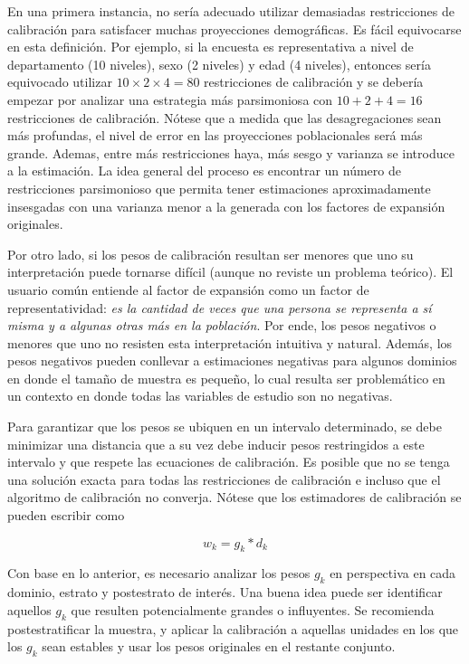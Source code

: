 \documentclass[
  10pt,
  spanish,
]{book}
\begin{document}
En una primera instancia, no sería adecuado utilizar demasiadas restricciones de calibración para satisfacer muchas proyecciones demográficas. Es fácil equivocarse en esta definición. Por ejemplo, si la encuesta es representativa a nivel de departamento (10 niveles), sexo (2 niveles) y edad (4 niveles), entonces sería equivocado utilizar \(10 \times 2 \times 4 = 80\) restricciones de calibración y se debería empezar por analizar una estrategia más parsimoniosa con \(10 + 2 + 4 = 16\) restricciones de calibración. Nótese que a medida que las desagregaciones sean más profundas, el nivel de error en las proyecciones poblacionales será más grande. Ademas, entre más restricciones haya, más sesgo y varianza se introduce a la estimación. La idea general del proceso es encontrar un número de restricciones parsimonioso que permita tener estimaciones aproximadamente insesgadas con una varianza menor a la generada con los factores de expansión originales.

Por otro lado, si los pesos de calibración resultan ser menores que uno su interpretación puede tornarse difícil (aunque no reviste un problema teórico). El usuario común entiende al factor de expansión como un factor de representatividad: \emph{es la cantidad de veces que una persona se representa a sí misma y a algunas otras más en la población}. Por ende, los pesos negativos o menores que uno no resisten esta interpretación intuitiva y natural. Además, los pesos negativos pueden conllevar a estimaciones negativas para algunos dominios en donde el tamaño de muestra es pequeño, lo cual resulta ser problemático en un contexto en donde todas las variables de estudio son no negativas.

Para garantizar que los pesos se ubiquen en un intervalo determinado, se debe minimizar una distancia que a su vez debe inducir pesos restringidos a este intervalo y que respete las ecuaciones de calibración. Es posible que no se tenga una solución exacta para todas las restricciones de calibración e incluso que el algoritmo de calibración no converja. Nótese que los estimadores de calibración se pueden escribir como

\[
w_k = g_k * d_k
\]

Con base en lo anterior, es necesario analizar los pesos \(g_k\) en perspectiva en cada dominio, estrato y postestrato de interés. Una buena idea puede ser identificar aquellos \(g_k\) que resulten potencialmente grandes o influyentes. Se recomienda postestratificar la muestra, y aplicar la calibración a aquellas unidades en los que los \(g_k\) sean estables y usar los pesos originales en el restante conjunto.
\end{document}
